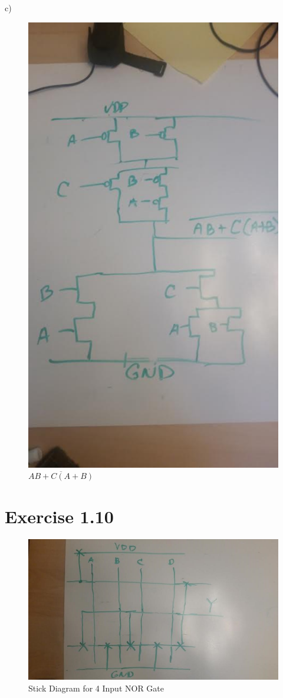 \documentclass[11pt]{article}
\begin{document}
c)
\begin{figure}[H]
\centering
\includegraphics[width=0.5\linewidth]{1-6c}
\caption{$\overline{AB+C(A+B)}$}
\label{fig:1-6c}
\end{figure}
\section{Exercise 1.10}
\begin{figure}[H]
\centering
\includegraphics[width=1\linewidth]{1-10}
\caption{Stick Diagram for 4 Input NOR Gate}
\label{fig:1-10}
\end{figure}
\end{document}
